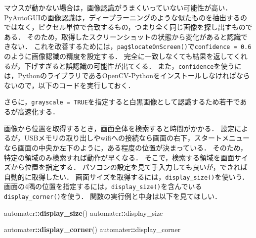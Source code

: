 \documentclass[
]{article}
\newenvironment{Shaded}{\begin{snugshade}}{\end{snugshade}}
\newcommand{\AttributeTok}[1]{\textcolor[rgb]{0.13,0.29,0.53}{#1}}
\newcommand{\ConstantTok}[1]{\textcolor[rgb]{0.56,0.35,0.01}{#1}}
\newcommand{\FloatTok}[1]{\textcolor[rgb]{0.00,0.00,0.81}{#1}}
\newcommand{\FunctionTok}[1]{\textcolor[rgb]{0.13,0.29,0.53}{\textbf{#1}}}
\newcommand{\NormalTok}[1]{#1}
\newcommand{\OtherTok}[1]{\textcolor[rgb]{0.56,0.35,0.01}{#1}}
\newcommand{\SpecialCharTok}[1]{\textcolor[rgb]{0.81,0.36,0.00}{\textbf{#1}}}
\newcommand{\StringTok}[1]{\textcolor[rgb]{0.31,0.60,0.02}{#1}}
\begin{document}
マウスが動かない場合は，画像認識がうまくいっていない可能性が高い．
PyAutoGUIの画像認識は，ディープラーニングのような似たものを抽出するのではなく，ピクセル単位で合致するもの，つまり全く同じ画像を探し出すものである．
そのため，取得したスクリーンショットの状態から変化があると認識できない．
これを改善するためには，\texttt{pag\$locateOnScreen()}で\texttt{confidence\ =\ 0.6}のように画像認識の精度を設定する．
完全に一致しなくても結果を返してくれるが，下げすぎると誤認識の可能性が出てくる．
また，\texttt{confidence}を使うには，PythonのライブラリであるOpenCV-Pythonをインストールしなければならないので，以下のコードを実行しておく．

\begin{Shaded}
\end{Shaded}

さらに，\texttt{grayscale\ =\ TRUE}を指定すると白黒画像として認識するため若干であるが高速化する．

\begin{Shaded}
\end{Shaded}

画像から位置を取得するとき，画面全体を検索すると時間がかかる．
設定によるが，USBメモリの取り出しやwifiへの接続なら画面の右下，スタートメニューなら画面の中央か左下のように，ある程度の位置が決まっている．
そのため，特定の領域のみ検索すれば動作が早くなる．
そこで，検索する領域を画面サイズから位置を指定する．
パソコンの設定を見て手入力しても良いが，できれば自動的に取得したい．
画面サイズを取得するには，\texttt{display\_size()}を使いう．
画面の4隅の位置を指定するには，\texttt{display\_size()}を含んでいる\texttt{display\_corner()}を使う．
関数の実行例と中身は以下を見てほしい．

\begin{Shaded}
\begin{Highlighting}[]
\NormalTok{automater}\SpecialCharTok{::}\FunctionTok{display\_size}\NormalTok{()}
\NormalTok{automater}\SpecialCharTok{::}\NormalTok{display\_size}

\NormalTok{automater}\SpecialCharTok{::}\FunctionTok{display\_corner}\NormalTok{()}
\NormalTok{automater}\SpecialCharTok{::}\NormalTok{display\_corner}
\end{Highlighting}
\end{Shaded}
\end{document}
